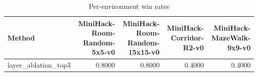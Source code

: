 \begin{table}[htbp]
\centering
\caption{Per-environment win rates}
\label{tab:per-env}
\begin{tabular}{lrrrr}
\toprule
\textbf{Method} & \textbf{MiniHack-Room-Random-5x5-v0} & \textbf{MiniHack-Room-Random-15x15-v0} & \textbf{MiniHack-Corridor-R2-v0} & \textbf{MiniHack-MazeWalk-9x9-v0} \\
\midrule
layer\_ablation\_top3 & 0.8000 & 0.8000 & 0.4000 & 0.4000 \\
\bottomrule
\end{tabular}
\end{table}